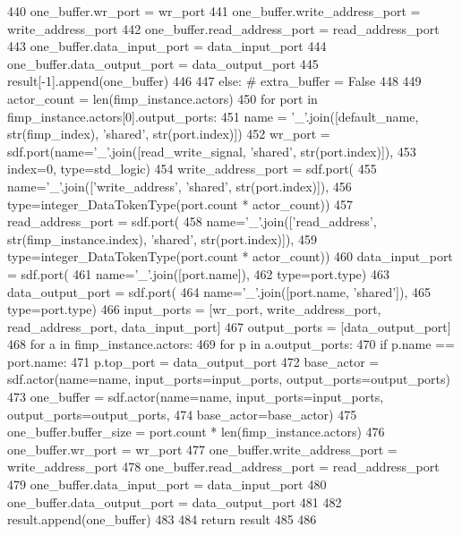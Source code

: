 \begin{DoxyCode}
440                 one\_buffer.wr\_port = wr\_port
441                 one\_buffer.write\_address\_port = write\_address\_port
442                 one\_buffer.read\_address\_port = read\_address\_port
443                 one\_buffer.data\_input\_port = data\_input\_port
444                 one\_buffer.data\_output\_port = data\_output\_port
445                 result[-1].append(one\_buffer)
446 
447     \textcolor{keywordflow}{else}:  \textcolor{comment}{# extra\_buffer = False}
448 
449         actor\_count = len(fimp\_instance.actors)
450         \textcolor{keywordflow}{for} port \textcolor{keywordflow}{in} fimp\_instance.actors[0].output\_ports:
451             name = \textcolor{stringliteral}{'\_'}.join([default\_name, str(fimp\_index), \textcolor{stringliteral}{'shared'}, str(port.index)])
452             wr\_port = sdf.port(name=\textcolor{stringliteral}{'\_'}.join([read\_write\_signal, \textcolor{stringliteral}{'shared'}, str(port.index)]),
453                                index=0, type=std\_logic)
454             write\_address\_port = sdf.port(
455                 name=\textcolor{stringliteral}{'\_'}.join([\textcolor{stringliteral}{'write\_address'}, \textcolor{stringliteral}{'shared'}, str(port.index)]),
456                 type=integer\_DataTokenType(port.count * actor\_count))
457             read\_address\_port = sdf.port(
458                 name=\textcolor{stringliteral}{'\_'}.join([\textcolor{stringliteral}{'read\_address'}, str(fimp\_instance.index), \textcolor{stringliteral}{'shared'}, str(port.index)]),
459                 type=integer\_DataTokenType(port.count * actor\_count))
460             data\_input\_port = sdf.port(
461                 name=\textcolor{stringliteral}{'\_'}.join([port.name]),
462                 type=port.type)
463             data\_output\_port = sdf.port(
464                 name=\textcolor{stringliteral}{'\_'}.join([port.name, \textcolor{stringliteral}{'shared'}]),
465                 type=port.type)
466             input\_ports = [wr\_port, write\_address\_port, read\_address\_port, data\_input\_port]
467             output\_ports = [data\_output\_port]
468             \textcolor{keywordflow}{for} a \textcolor{keywordflow}{in} fimp\_instance.actors:
469                 \textcolor{keywordflow}{for} p \textcolor{keywordflow}{in} a.output\_ports:
470                     \textcolor{keywordflow}{if} p.name == port.name:
471                         p.top\_port = data\_output\_port
472             base\_actor = sdf.actor(name=name, input\_ports=input\_ports, output\_ports=output\_ports)
473             one\_buffer = sdf.actor(name=name, input\_ports=input\_ports, output\_ports=output\_ports,
474                                    base\_actor=base\_actor)
475             one\_buffer.buffer\_size = port.count * len(fimp\_instance.actors)
476             one\_buffer.wr\_port = wr\_port
477             one\_buffer.write\_address\_port = write\_address\_port
478             one\_buffer.read\_address\_port = read\_address\_port
479             one\_buffer.data\_input\_port = data\_input\_port
480             one\_buffer.data\_output\_port = data\_output\_port
481 
482             result.append(one\_buffer)
483 
484     \textcolor{keywordflow}{return} result
485 
486 
\end{DoxyCode}
